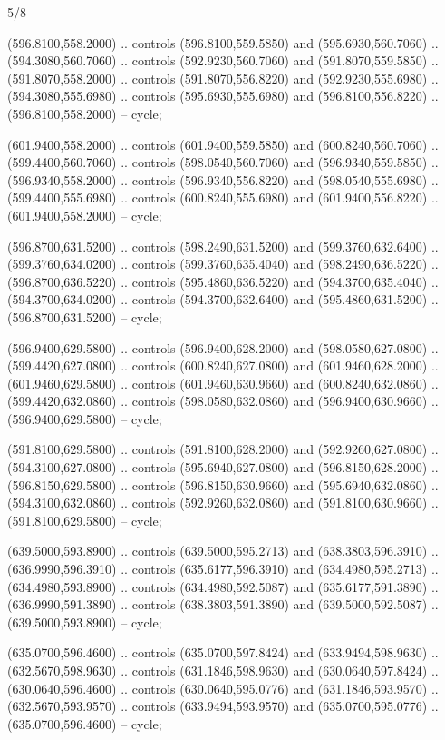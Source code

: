 \begin{flagdescription}{5/8}
\begin{scope}[shift={(m)}]
\begin{scope}[scale=\flagwidth/220,y=0.1mm, x=0.1mm, yscale=-1,shift={(-596,-360)}]
\begin{scope}[draw=black,fill=red,line width=0.381\lw]
 (596.8100,558.2000) .. controls (596.8100,559.5850) and
  (595.6930,560.7060) .. (594.3080,560.7060) .. controls (592.9230,560.7060) and
  (591.8070,559.5850) .. (591.8070,558.2000) .. controls (591.8070,556.8220) and
  (592.9230,555.6980) .. (594.3080,555.6980) .. controls (595.6930,555.6980) and
  (596.8100,556.8220) .. (596.8100,558.2000) -- cycle;

 (601.9400,558.2000) .. controls (601.9400,559.5850) and
  (600.8240,560.7060) .. (599.4400,560.7060) .. controls (598.0540,560.7060) and
  (596.9340,559.5850) .. (596.9340,558.2000) .. controls (596.9340,556.8220) and
  (598.0540,555.6980) .. (599.4400,555.6980) .. controls (600.8240,555.6980) and
  (601.9400,556.8220) .. (601.9400,558.2000) -- cycle;

 (596.8700,631.5200) .. controls (598.2490,631.5200) and
  (599.3760,632.6400) .. (599.3760,634.0200) .. controls (599.3760,635.4040) and
  (598.2490,636.5220) .. (596.8700,636.5220) .. controls (595.4860,636.5220) and
  (594.3700,635.4040) .. (594.3700,634.0200) .. controls (594.3700,632.6400) and
  (595.4860,631.5200) .. (596.8700,631.5200) -- cycle;

 (596.9400,629.5800) .. controls (596.9400,628.2000) and
  (598.0580,627.0800) .. (599.4420,627.0800) .. controls (600.8240,627.0800) and
  (601.9460,628.2000) .. (601.9460,629.5800) .. controls (601.9460,630.9660) and
  (600.8240,632.0860) .. (599.4420,632.0860) .. controls (598.0580,632.0860) and
  (596.9400,630.9660) .. (596.9400,629.5800) -- cycle;

 (591.8100,629.5800) .. controls (591.8100,628.2000) and
  (592.9260,627.0800) .. (594.3100,627.0800) .. controls (595.6940,627.0800) and
  (596.8150,628.2000) .. (596.8150,629.5800) .. controls (596.8150,630.9660) and
  (595.6940,632.0860) .. (594.3100,632.0860) .. controls (592.9260,632.0860) and
  (591.8100,630.9660) .. (591.8100,629.5800) -- cycle;

 (639.5000,593.8900) .. controls (639.5000,595.2713) and
  (638.3803,596.3910) .. (636.9990,596.3910) .. controls (635.6177,596.3910) and
  (634.4980,595.2713) .. (634.4980,593.8900) .. controls (634.4980,592.5087) and
  (635.6177,591.3890) .. (636.9990,591.3890) .. controls (638.3803,591.3890) and
  (639.5000,592.5087) .. (639.5000,593.8900) -- cycle;

 (635.0700,596.4600) .. controls (635.0700,597.8424) and
  (633.9494,598.9630) .. (632.5670,598.9630) .. controls (631.1846,598.9630) and
  (630.0640,597.8424) .. (630.0640,596.4600) .. controls (630.0640,595.0776) and
  (631.1846,593.9570) .. (632.5670,593.9570) .. controls (633.9494,593.9570) and
  (635.0700,595.0776) .. (635.0700,596.4600) -- cycle;


\end{scope}
\end{scope}
\end{scope}
\end{flagdescription}
